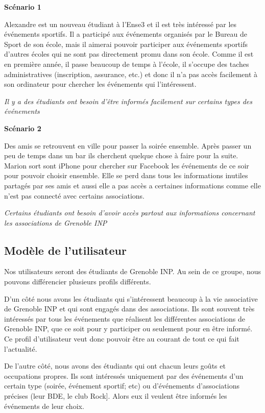 \documentclass[a4paper, 11px]{article}
\begin{document}
{\bf Scénario 1} 

Alexandre est un nouveau étudiant à l'Ense3 et il est très intéressé par les événements sportifs. Il a participé aux événements organisés par le Bureau de Sport de son école, mais il aimerai pouvoir participer aux événements sportifs d'autres écoles qui ne sont pas directement promu dans son école. Comme il est en première année, il passe beaucoup de temps à l'école, il s'occupe des taches administratives (inscription, assurance, etc.) et donc il n'a pas accès facilement à son ordinateur pour chercher les événements qui l'intéressent. 

\textit{Il y a des étudiants ont besoin d'être informés facilement sur certains types des événements}


{\bf Scénario 2}

Des amis se retrouvent en ville pour passer la soirée ensemble. Après passer un peu de temps dans un bar ils cherchent quelque chose à faire pour la suite. Marion sort sont iPhone pour chercher sur Facebook les événements de ce soir pour pouvoir choisir ensemble. Elle se perd dans tous les informations inutiles partagés par ses amis et aussi elle a pas accès a certaines informations comme elle n'est pas connecté avec certains associations.

\textit{Certains étudiants ont besoin d'avoir accès partout aux informations concernant les associations de Grenoble INP}


\subsection{Modèle de l'utilisateur}

Nos utilisateurs seront des étudiants de Grenoble INP. Au sein de ce groupe, nous pouvons différencier plusieurs profils différents.

D'un côté nous avons les étudiants qui s'intéressent beaucoup à la vie associative de Grenoble INP et qui sont engagés dans des associations. Ils sont souvent très intéressés par tous les événements que réalisent les différentes associations de Grenoble INP, que ce soit pour y participer ou seulement
pour en être informé. Ce profil d'utilisateur veut donc pouvoir être au courant de tout ce qui fait l'actualité.


De l'autre côté, nous avons des étudiants qui ont chacun leurs goûts et occupations propres. Ils sont intéressés uniquement par des événements d'un certain type (soirée, événement sportif; etc) ou d'événements d'associations précises (leur BDE, le club Rock]. Alors eux il veulent être informés les événements de leur choix.
\end{document}
